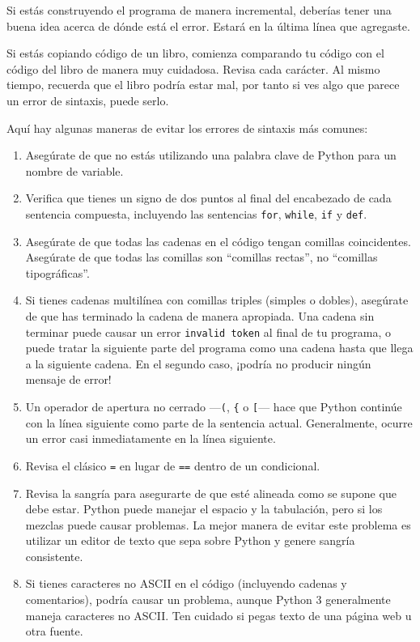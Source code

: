 \documentclass[10pt]{book}
\begin{document}
Si estás construyendo el programa de manera incremental, deberías tener
una buena idea acerca de dónde está el error.  Estará en la última
línea que agregaste.

Si estás copiando código de un libro, comienza comparando
tu código con el código del libro de manera muy cuidadosa.  Revisa cada carácter.
Al mismo tiempo, recuerda que el libro podría estar mal, por tanto
si ves algo que parece un error de sintaxis, puede serlo.

Aquí hay algunas maneras de evitar los errores de sintaxis más comunes:

\begin{enumerate}

\item Asegúrate de que no estás utilizando una palabra clave de Python para un nombre de variable.

\item Verifica que tienes un signo de dos puntos al final del encabezado de cada
sentencia compuesta, incluyendo las sentencias {\tt for}, {\tt while},
{\tt if} y {\tt def}.

\item Asegúrate de que todas las cadenas en el código tengan comillas
coincidentes.  Asegúrate de que todas las comillas son
``comillas rectas'', no ``comillas tipográficas''.

\item Si tienes cadenas multilínea con comillas triples (simples o dobles),
asegúrate de que has terminado la cadena de manera apropiada.  Una cadena sin terminar
puede causar un error {\tt invalid token} al final de tu programa,
o puede tratar la siguiente parte del programa como una cadena hasta que
llega a la siguiente cadena.  En el segundo caso, ¡podría no producir ningún mensaje
de error!

\item Un operador de apertura no cerrado ---\verb+(+, \verb+{+ o
  \verb+[+--- hace que Python continúe con la línea siguiente como parte de la
  sentencia actual.  Generalmente, ocurre un error casi inmediatamente en
  la línea siguiente.

\item Revisa el clásico {\tt =} en lugar de {\tt ==} dentro
de un condicional.

\item Revisa la sangría para asegurarte de que esté alineada como se
supone que debe estar.  Python puede manejar el espacio y la tabulación, pero si los mezclas
puede causar problemas.  La mejor manera de evitar este problema
es utilizar un editor de texto que sepa sobre Python y genere
sangría consistente.

\item Si tienes caracteres no ASCII en el código (incluyendo cadenas
y comentarios), podría causar un problema, aunque Python 3 generalmente
maneja caracteres no ASCII.  Ten cuidado si pegas texto de
una página web u otra fuente.

\end{enumerate}
\end{document}

